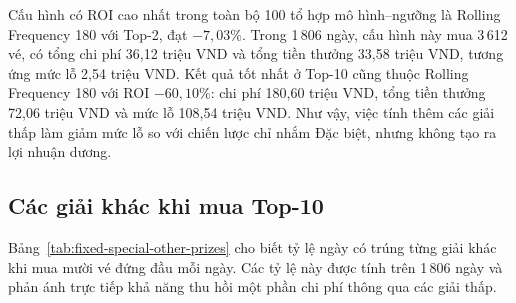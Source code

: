 Cấu hình có ROI cao nhất trong toàn bộ 100 tổ hợp mô hình--ngưỡng là Rolling Frequency 180 với Top-2, đạt $-7,03\%$. Trong 1\,806 ngày, cấu hình này mua 3\,612 vé, có tổng chi phí 36,12 triệu VND và tổng tiền thưởng 33,58 triệu VND, tương ứng mức lỗ 2,54 triệu VND. Kết quả tốt nhất ở Top-10 cũng thuộc Rolling Frequency 180 với ROI $-60,10\%$: chi phí 180,60 triệu VND, tổng tiền thưởng 72,06 triệu VND và mức lỗ 108,54 triệu VND. Như vậy, việc tính thêm các giải thấp làm giảm mức lỗ so với chiến lược chỉ nhắm Đặc biệt, nhưng không tạo ra lợi nhuận dương.

\subsection{Các giải khác khi mua Top-10}
Bảng~\ref{tab:fixed-special-other-prizes} cho biết tỷ lệ ngày có trúng từng giải khác khi mua mười vé đứng đầu mỗi ngày. Các tỷ lệ này được tính trên 1\,806 ngày và phản ánh trực tiếp khả năng thu hồi một phần chi phí thông qua các giải thấp.

\begin{table}[H]
	\centering\scriptsize
	\caption{Tỷ lệ ngày trúng các giải khác và tiền thưởng khi mua Top-10}
	\label{tab:fixed-special-other-prizes}
\end{table}

